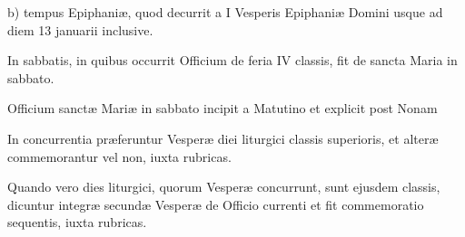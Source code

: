 \documentclass[vesperale_romanum.tex]{subfiles}
\begin{document}
b) tempus Epiphaniæ, quod decurrit a I Vesperis Epiphaniæ Domini usque ad diem 13 januarii inclusive.


In sabbatis, in quibus occurrit Officium de feria IV classis, fit de sancta Maria in sabbato.

Officium sanctæ Mariæ in sabbato incipit a Matutino et explicit post Nonam

 
In concurrentia præferuntur Vesperæ diei liturgici classis superioris, et alteræ commemorantur vel non, iuxta rubricas.

Quando vero dies liturgici, quorum Vesperæ concurrunt, sunt ejusdem classis, dicuntur integræ secundæ Vesperæ de Officio currenti et fit commemoratio sequentis, iuxta rubricas.

\newpage

\end{document}
